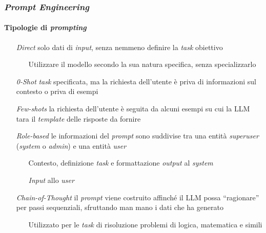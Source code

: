 \begin{frame}[t] \frametitle{\emph{Prompt Engineering}}
\framesubtitle{Tipologie di \emph{prompting}}
{\scriptsize
    \begin{minipage}[t]{\textwidth}
        \begin{itemize}[leftmargin=50pt,align=right]
            \item[\alert{\emph{Direct}}] solo dati di \emph{input}, senza nemmeno definire la \emph{task} obiettivo
            \begin{itemize}[leftmargin=15pt,align=right]
                \item[\alert{\faHandORight}] Utilizzare il modello secondo la sua natura specifica, senza specializzarlo
            \end{itemize}
            \item[\alert{\emph{0-Shot}}] \emph{task} specificata, ma la richiesta dell'utente è priva di informazioni sul contesto o priva di esempi
            \item[\alert{\emph{Few-shots}}] la richiesta dell'utente è seguita da alcuni esempi su cui la LLM tara il \emph{template} delle risposte da fornire
            \item[\alert{\emph{Role-based}}] le informazioni del \emph{prompt} sono suddivise tra una entità \emph{superuser} (\emph{system} o \emph{admin}) e una entità \emph{user}
            \begin{itemize}[leftmargin=15pt,align=right]
                \item[\alert{\faHandORight}] Contesto, definizione \emph{task} e formattazione \emph{output} al \emph{system}
                \item[\alert{\faHandORight}] \emph{Input} allo \emph{user}
            \end{itemize}
            \item[\alert{\emph{Chain-of-Thought}}] il \emph{prompt} viene costruito affinché il LLM possa ``ragionare'' per passi sequenziali, sfruttando man mano i dati che ha generato
            \begin{itemize}[leftmargin=15pt,align=right]
                \item[\alert{\faHandORight}] Utilizzato per le \emph{task} di risoluzione problemi di logica, matematica e simili
            \end{itemize}
        \end{itemize}
    \end{minipage}
}
\end{frame}
%